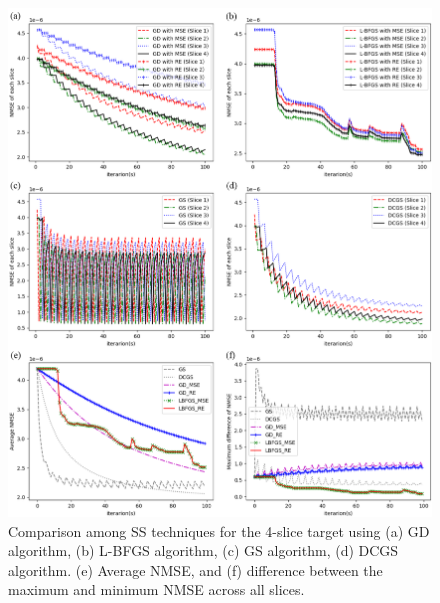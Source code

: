 \begin{figure}[H]
	\centering
	\includegraphics[width=1.0\textwidth]{Comparison_among_SS_methods_for_the_4_slice_target}
	\caption{Comparison among SS techniques for the 4-slice target using (a) GD algorithm, (b) L-BFGS algorithm, (c) GS algorithm, (d) DCGS algorithm. (e) Average NMSE, and (f) difference between the maximum and minimum NMSE across all slices.}
	\label{fig:SS_NMSE_iteration_compare}
\end{figure}
